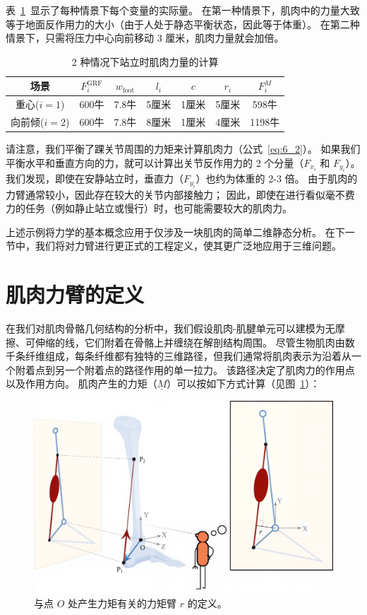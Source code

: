 表~\ref{tab:6_1}~显示了每种情景下每个变量的实际量。
在第一种情景下，肌肉中的力量大致等于地面反作用力的大小（由于人处于静态平衡状态，因此等于体重）。
在第二种情景下，只需将压力中心向前移动 3 厘米，肌肉力量就会加倍。


\begin{table}[htbp]
	\caption{2 种情况下站立时肌肉力量的计算} \label{tab:6_1} \centering
	\begin{tabular}{ccccccc} %
		\toprule
		场景 & $F_i^{\text{GRF}}$ & $w_\text{foot}$ & $l_i$ & $c$ & $r_i$ & $F_i^M$ \\
		\midrule
		重心($i=1$) & 600牛 &  7.8牛 & 5厘米 & 1厘米 & 5厘米 & 598牛 \\
		\midrule
		向前倾($i=2$) & 600牛 &  7.8牛 & 8厘米 & 1厘米 & 4厘米 & 1198牛 \\
		\bottomrule
	\end{tabular}
\end{table}


请注意，我们平衡了踝关节周围的力矩来计算肌肉力（公式~\ref{eq:6_2}）。
如果我们平衡水平和垂直方向的力，就可以计算出关节反作用力的 2 个分量（$F_{x_i}$ 和 $F_{y_i}$）。
我们发现，即使在安静站立时，垂直力（$F_{y_i}$）也约为体重的 2-3 倍。
由于肌肉的力臂通常较小，因此存在较大的关节内部接触力；
因此，即使在进行看似毫不费力的任务（例如静止站立或慢行）时，也可能需要较大的肌肉力。


上述示例将力学的基本概念应用于仅涉及一块肌肉的简单二维静态分析。
在下一节中，我们将对力臂进行更正式的工程定义，使其更广泛地应用于三维问题。



\section{肌肉力臂的定义}

在我们对肌肉骨骼几何结构的分析中，我们假设肌肉-肌腱单元可以建模为无摩擦、可伸缩的线，它们附着在骨骼上并缠绕在解剖结构周围。
尽管生物肌肉由数千条纤维组成，每条纤维都有独特的三维路径，但我们通常将肌肉表示为沿着从一个附着点到另一个附着点的路径作用的单一拉力。
该路径决定了肌肉力的作用点以及作用方向。
肌肉产生的力矩（$ \underline{M} $）可以按如下方式计算（见图~\ref{fig:6_2}）：


\begin{figure}[!htb]
	\centering
	\includegraphics[width=0.9\linewidth]{chap6/6_2}
	\caption{与点 $O$ 处产生力矩有关的力矩臂 $r$ 的定义。 \label{fig:6_2}}
\end{figure}


